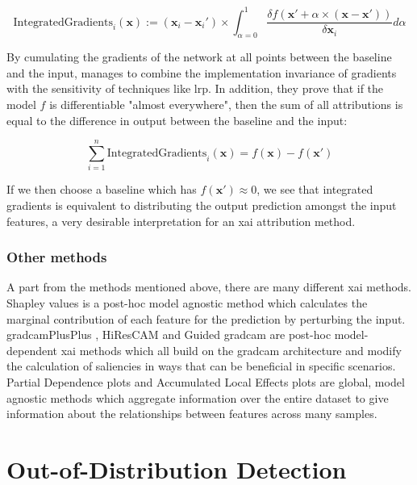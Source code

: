 \documentclass[UKenglish]{uiomasterthesis} %
\theoremstyle{definition}
\begin{document}
\begin{equation}
    \text{IntegratedGradients}_i(\mathbf{x}) := (\mathbf{x}_i - \mathbf{x}_i') \times \int_{\alpha = 0}^1 \frac{\delta f(\mathbf{x}' + \alpha \times (\mathbf{x} - \mathbf{x}'))}{\delta \mathbf{x}_i}d\alpha
\end{equation}

\noindent By cumulating the gradients of the network at all points between the baseline and the input, \cite{integratedgradients} manages to combine the implementation invariance of gradients with the sensitivity of techniques like \ac{lrp}. In addition, they prove that if the model $f$ is differentiable "almost everywhere", then the sum of all attributions is equal to the difference in output between the baseline and the input:

\begin{equation}
    \sum_{i=1}^n \text{IntegratedGradients}_i(\mathbf{x}) = f(\mathbf{x}) - f(\mathbf{x'})
\end{equation}

\noindent If we then choose a baseline which has $f(\mathbf{x'}) \approx 0$, we see that integrated gradients is equivalent to distributing the output prediction amongst the input features, a very desirable interpretation for an \ac{xai} attribution method.

\subsubsection{Other methods}

A part from the methods mentioned above, there are many different \ac{xai} methods. Shapley values \cite{shapley} is a post-hoc model agnostic method which calculates the marginal contribution of each feature for the prediction by perturbing the input. \ac{gradcam}PlusPlus \cite{gradcamplusplus}, HiResCAM \cite{hirescam} and Guided \ac{gradcam} \cite{gradcam} are post-hoc model-dependent \ac{xai} methods which all build on the \ac{gradcam} architecture and modify the calculation of saliencies in ways that can be beneficial in specific scenarios. Partial Dependence plots \cite{pdp} and Accumulated Local Effects plots \cite{ale} are global, model agnostic methods which aggregate information over the entire dataset to give information about the relationships between features across many samples. %


\section{Out-of-Distribution Detection} \label{ood_intro}
\end{document}
